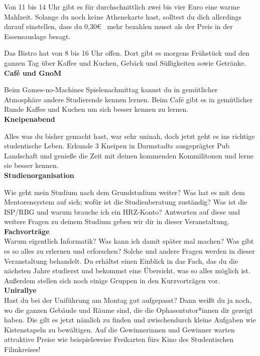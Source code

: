 {Von 11 bis 14 Uhr gibt es für durchschnittlich zwei bis vier Euro eine warme Mahlzeit. Solange du noch keine Athenekarte hast, solltest du dich allerdings darauf einstellen, dass du 0,30\euro~ mehr bezahlen musst als der Preis in der Essensauslage besagt.

Das Bistro hat von 8 bis 16 Uhr offen. Dort gibt es morgens Frühstück und den ganzen Tag über Kaffee und Kuchen, Gebäck und Süßigkeiten sowie Getränke.\\

\noindent\textbf{Caf\'e und GnoM}

Beim Games-no-Machines Spielenachmittag kannst du in gemütlicher Atmosphäre andere Studierende kennen lernen. Beim Caf\'e gibt es in gemütlicher Runde Kaffee und Kuchen um sich besser kennen zu lernen.\\

\noindent\textbf{Kneipenabend}

Alles was du bisher gemacht hast, war sehr uninah, doch jetzt geht es ins richtige studentische Leben.
Erkunde 3 Kneipen in Darmstadts ausgeprägter Pub Landschaft und genieße die Zeit mit deinen kommenden Kommilitonen und lerne sie besser kennen. \\
\newpage
\noindent\textbf{Studienorganisation}

Wie geht mein Studium nach dem Grundstudium weiter? Was hat es mit dem Mentorensystem auf sich; wofür ist die Studienberatung zuständig? Was ist die ISP/RBG und warum  brauche ich ein HRZ-Konto? Antworten auf diese und weitere Fragen zu deinem Studium geben wir dir in dieser Veranstaltung.\\

\noindent\textbf{Fachvorträge}\\
Warum eigentlich Informatik? Was kann ich damit später mal machen? Was gibt es so alles zu erlernen und erforschen? Solche und andere Fragen werden in dieser Veranstaltung behandelt. Du erhältst einen Einblick in das Fach, das du die nächsten Jahre studierst und bekommst eine Übersicht, was so alles möglich ist. Außerdem stellen sich noch einige Gruppen in den Kurzvorträgen vor.\\

\noindent\textbf{Unirallye}\\
Hast du bei der Uniführung am Montag gut aufgepasst? Dann weißt du ja noch, wo die ganzen Gebäude und Räume sind, die die Ophasentutor*innen dir gezeigt haben. Die gilt es jetzt nämlich zu finden und zwischendurch kleine Aufgaben wie Kistenstapeln zu bewältigen. Auf die Gewinnerinnen und Gewinner warten attraktive Preise wie beispielsweise Freikarten fürs Kino des Studentischen Filmkreises!\\

}
